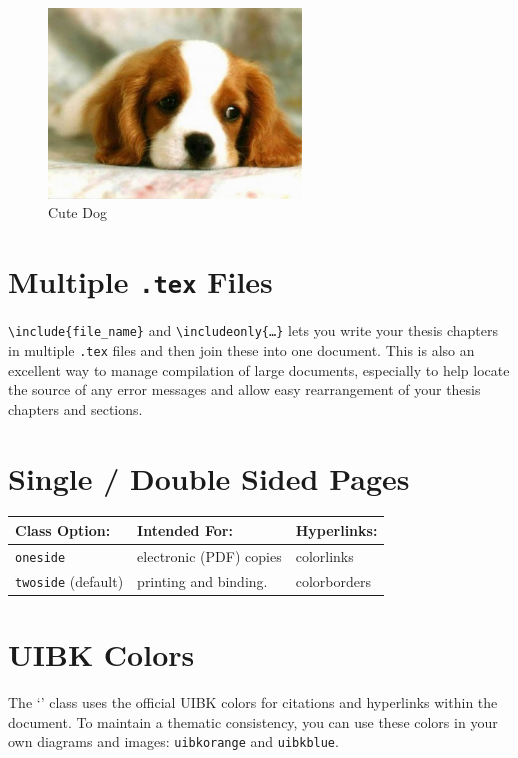 \documentclass[bachelor]{iisthesis}
\begin{document}
\begin{figure}[h]
  \centering
  \includegraphics[width=0.6\textwidth]{dog.jpg}
  \caption{Cute Dog}
  \label{fig:dog}
\end{figure}

\section{Multiple \texttt{.tex} Files}
\texttt{\textbackslash include\{file\_name\}} and \texttt{\textbackslash includeonly\{\ldots\}} lets you write your thesis chapters in multiple \texttt{.tex} files and then join these into one document. This is also an excellent way to manage compilation of large documents, especially to help locate the source of any error messages and allow easy rearrangement of your thesis chapters and sections.

\section{Single / Double Sided Pages}
\begin{tabular}{|l|l|l|}
  \hline
  Class Option:              & Intended For:           & Hyperlinks: \\
  \hline
  \texttt{oneside}           & electronic (PDF) copies & colorlinks  \\
  \texttt{twoside} (default) & printing and binding.   & colorborders\\
  \hline
\end{tabular}

\section{UIBK Colors}
The `\uibkclass' class uses the official UIBK colors for citations and hyperlinks within the document. To maintain a thematic consistency, you can use these colors in your own diagrams and images: \textcolor{uibkorange}{\texttt{uibkorange}} and \textcolor{uibkblue}{\texttt{uibkblue}}.
\end{document}
